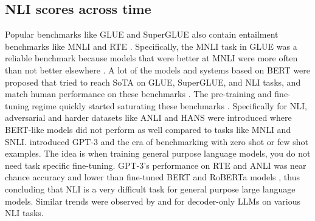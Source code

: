 \subsection{NLI scores across time}
\label{related:mlms}

Popular benchmarks like GLUE \citep{wang2019glue} and SuperGLUE \citep{wang2019superglue} also contain entailment benchmarks like MNLI \citep{williams-etal-2018-broad} and RTE \citep{dagan2005pascal}.
Specifically, the MNLI task in GLUE was a reliable benchmark because models that were better at MNLI were more often than not better elsewhere \citep{raffel2023t5,zaheer2020big}.
A lot of the models and systems based on BERT \citep{devlin2019bert} were proposed that tried to reach SoTA on GLUE, SuperGLUE, and NLI tasks, and match human performance on these benchmarks \citep{he2021deberta,he2021debertav3,patra2022englishcentric}. 
The pre-training and fine-tuning regime quickly started saturating these benchmarks \citep{raffel2023t5}. Specifically for NLI, adversarial and harder datasets like ANLI \citep{nie-etal-2020-adversarial} and HANS \citep{mccoy-etal-2019-right} were introduced where BERT-like models did not perform as well compared to tasks like MNLI and SNLI.
\citet{brown2020language} introduced GPT-3 and the era of benchmarking with zero shot or few shot examples. 
The idea is when training general purpose language models, you do not need task specific fine-tuning. 
GPT-3's performance on RTE and ANLI was near chance accuracy and lower than fine-tuned BERT and RoBERTa models \citep{liu2019roberta}, thus concluding that NLI is a very difficult task for general purpose large language models.
Similar trends were observed by \citet{ohmer2024form} and \citet{weber-etal-2023-mind} for decoder-only LLMs on various NLI tasks. 


